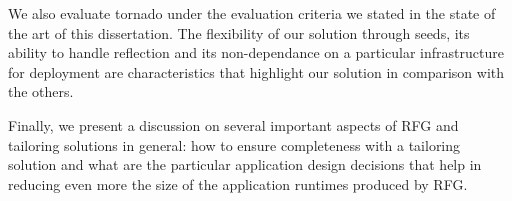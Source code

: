 We also evaluate tornado under the evaluation criteria we stated in the state of the art of this dissertation. The flexibility of our solution through seeds, its ability to handle reflection and its non-dependance on a particular infrastructure for deployment are characteristics that highlight our solution in comparison with the others.

Finally, we present a discussion on several important aspects of RFG and tailoring solutions in general: how to ensure completeness with a tailoring solution and what are the particular application design decisions that help in reducing even more the size of the application runtimes produced by RFG.

